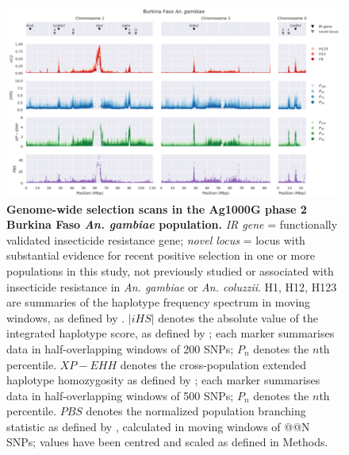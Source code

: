 \documentclass[a4paper,11pt,abstracton,hidelinks]{scrartcl}
\begin{document}
\begin{landscape}

\begin{figure}[t!]
	\begin{center}
		\includegraphics*[width=1\linewidth,center]{artwork/gwss_bf_gam_gw_ug_gam_gq_gam.png}
	\end{center}
	\caption{
	\textbf{Genome-wide selection scans in the Ag1000G phase 2 Burkina Faso \textit{An. gambiae} population.} 
	\textit{IR gene} = functionally validated insecticide resistance gene; \textit{novel locus} = locus with substantial evidence for recent positive selection in one or more populations in this study, not previously studied or associated with insecticide resistance in \textit{An. gambiae} or \textit{An. coluzzii}. 
	H1, H12, H123 are summaries of the haplotype frequency spectrum in moving windows, as defined by \citet{Garud2015}. 
	$|iHS|$ denotes the absolute value of the integrated haplotype score, as defined by \citet{Voight2006}; each marker summarises data in half-overlapping windows of 200 SNPs; $P_{n}$ denotes the $n$th percentile. 
	$XP-EHH$ denotes the cross-population extended haplotype homozygosity as defined by \citet{Sabeti2007}; 	each marker summarises data in half-overlapping windows of 500 SNPs; $P_{n}$ denotes the $n$th percentile.
	$PBS$ denotes the normalized population branching statistic as defined by \citet{Crawford2017}, calculated in moving windows of @@N SNPs; values have been centred and scaled as defined in Methods.
	} 
	\label{fig:gwss_bf_gam}
\end{figure}



\end{landscape}
\end{document}
